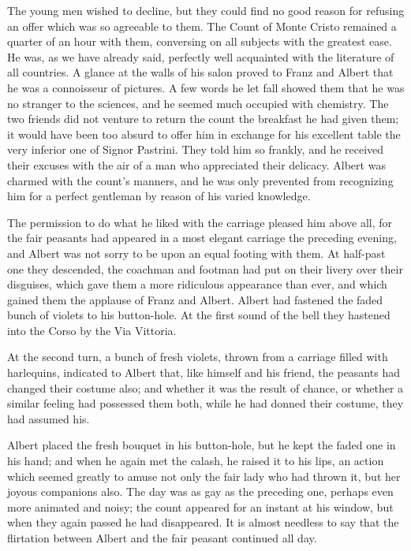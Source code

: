 The young men wished to decline, but they could find no good reason for
refusing an offer which was so agreeable to them. The Count of Monte
Cristo remained a quarter of an hour with them, conversing on all
subjects with the greatest ease. He was, as we have already said,
perfectly well acquainted with the literature of all countries. A
glance at the walls of his salon proved to Franz and Albert that he was
a connoisseur of pictures. A few words he let fall showed them that he
was no stranger to the sciences, and he seemed much occupied with
chemistry. The two friends did not venture to return the count the
breakfast he had given them; it would have been too absurd to offer him
in exchange for his excellent table the very inferior one of Signor
Pastrini. They told him so frankly, and he received their excuses with
the air of a man who appreciated their delicacy. Albert was charmed
with the count’s manners, and he was only prevented from recognizing
him for a perfect gentleman by reason of his varied knowledge.

The permission to do what he liked with the carriage pleased him above
all, for the fair peasants had appeared in a most elegant carriage the
preceding evening, and Albert was not sorry to be upon an equal footing
with them. At half-past one they descended, the coachman and footman
had put on their livery over their disguises, which gave them a more
ridiculous appearance than ever, and which gained them the applause of
Franz and Albert. Albert had fastened the faded bunch of violets to his
button-hole. At the first sound of the bell they hastened into the
Corso by the Via Vittoria.

At the second turn, a bunch of fresh violets, thrown from a carriage
filled with harlequins, indicated to Albert that, like himself and his
friend, the peasants had changed their costume also; and whether it was
the result of chance, or whether a similar feeling had possessed them
both, while he had donned their costume, they had assumed his.

Albert placed the fresh bouquet in his button-hole, but he kept the
faded one in his hand; and when he again met the calash, he raised it
to his lips, an action which seemed greatly to amuse not only the fair
lady who had thrown it, but her joyous companions also. The day was as
gay as the preceding one, perhaps even more animated and noisy; the
count appeared for an instant at his window, but when they again passed
he had disappeared. It is almost needless to say that the flirtation
between Albert and the fair peasant continued all day.

